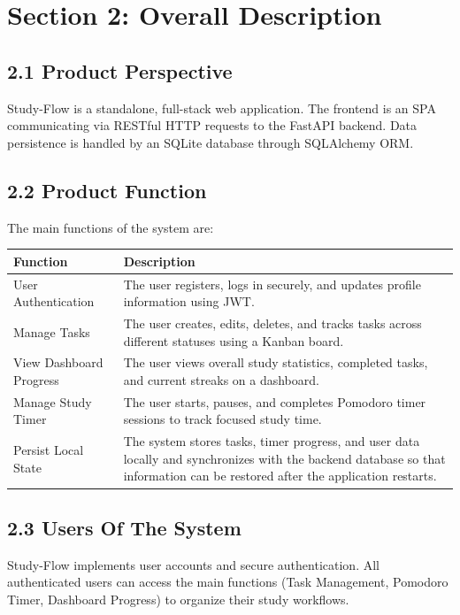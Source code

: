 \documentclass[12pt]{article}
\begin{document}
\section*{Section 2: Overall Description}
\subsection*{2.1 Product Perspective}
Study-Flow is a standalone, full-stack web application. The frontend is an SPA communicating via RESTful HTTP requests to the FastAPI backend. Data persistence is handled by an SQLite database through SQLAlchemy ORM.

\subsection*{2.2 Product Function}
The main functions of the system are:

\vspace{0.3cm}
\noindent
\renewcommand{\arraystretch}{1.5}
\begin{xltabular}{\textwidth}{|l|X|}
\hline
\textbf{Function} & \textbf{Description} \\ \hline
User Authentication & The user registers, logs in securely, and updates profile information using JWT. \\ \hline
Manage Tasks & The user creates, edits, deletes, and tracks tasks across different statuses using a Kanban board. \\ \hline
View Dashboard Progress & The user views overall study statistics, completed tasks, and current streaks on a dashboard. \\ \hline
Manage Study Timer & The user starts, pauses, and completes Pomodoro timer sessions to track focused study time. \\ \hline
Persist Local State & The system stores tasks, timer progress, and user data locally and synchronizes with the backend database so that information can be restored after the application restarts. \\ \hline
\end{xltabular}
\vspace{0.3cm}

\subsection*{2.3 Users Of The System}
Study-Flow implements user accounts and secure authentication. All authenticated users can access the main functions (Task Management, Pomodoro Timer, Dashboard Progress) to organize their study workflows.
\end{document}

